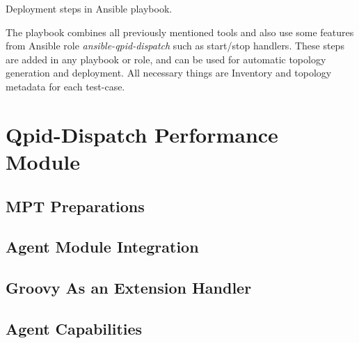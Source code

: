 \begin{center}
	\begin{algorithm}[H]
		\LinesNumbered

		\;

		\;

		 \caption{Deployment steps in Ansible playbook. }
		 \label{alg:ansible_deployment}
	\end{algorithm}
\end{center}

The playbook combines all previously mentioned tools and also use some features from Ansible role \emph{ansible-qpid-dispatch}\footnotemark{} such as start/stop handlers. These steps are added in any playbook or role, and can be used for automatic topology generation and deployment. All necessary things are Inventory and topology metadata for each test-case.


\section{Qpid-Dispatch Performance Module}

\subsection{MPT Preparations}
\label{MPT Preparations}

\subsection{Agent Module Integration}

\subsection{Groovy As an Extension Handler}

\subsection{Agent Capabilities}
